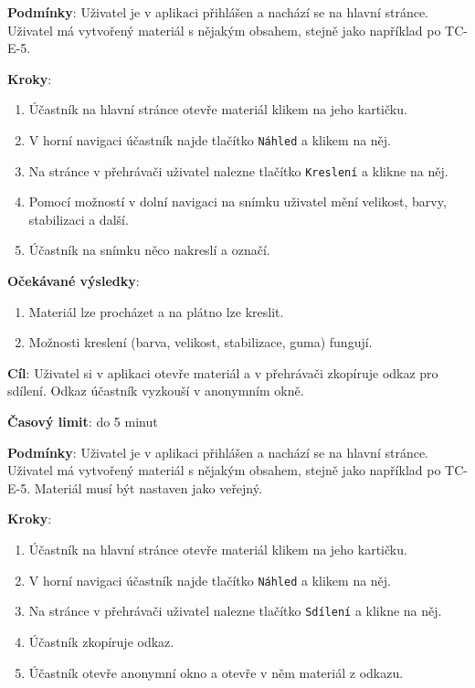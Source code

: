 \textbf{Podmínky}:  Uživatel je v aplikaci přihlášen a nachází se na hlavní stránce.  Uživatel má vytvořený materiál s nějakým obsahem, stejně jako například po TC-E-5.

\textbf{Kroky}:

\begin{enumerate}[leftmargin=1.4cm]
    \item Účastník na hlavní stránce otevře materiál klikem na jeho kartičku.
    \item V horní navigaci účastník najde tlačítko \verb|Náhled| a klikem na něj.
    \item Na stránce v přehrávači uživatel nalezne tlačítko \verb|Kreslení| a klikne na něj.
    \item Pomocí možností v dolní navigaci na snímku uživatel mění velikost, barvy, stabilizaci a další.
    \item Účastník na snímku něco nakreslí a označí.
\end{enumerate}

\textbf{Očekávané výsledky}:

\begin{enumerate}[leftmargin=1.4cm]
    \item Materiál lze procházet a na plátno lze kreslit.
    \item Možnosti kreslení (barva, velikost, stabilizace, guma) fungují.
\end{enumerate}






\vspace{1em}

\textbf{Cíl}: Uživatel si v aplikaci otevře materiál a v přehrávači zkopíruje odkaz pro sdílení. Odkaz účastník vyzkouší v anonymním okně.

\textbf{Časový limit}: do 5 minut

\textbf{Podmínky}:  Uživatel je v aplikaci přihlášen a nachází se na hlavní stránce.  Uživatel má vytvořený materiál s nějakým obsahem, stejně jako například po TC-E-5. Materiál musí být nastaven jako veřejný.

\textbf{Kroky}:

\begin{enumerate}[leftmargin=1.4cm]
    \item Účastník na hlavní stránce otevře materiál klikem na jeho kartičku.
    \item V horní navigaci účastník najde tlačítko \verb|Náhled| a klikem na něj.
    \item Na stránce v přehrávači uživatel nalezne tlačítko \verb|Sdílení| a klikne na něj.
    \item Účastník zkopíruje odkaz.
    \item Účastník otevře anonymní okno a otevře v něm materiál z odkazu.
\end{enumerate}

